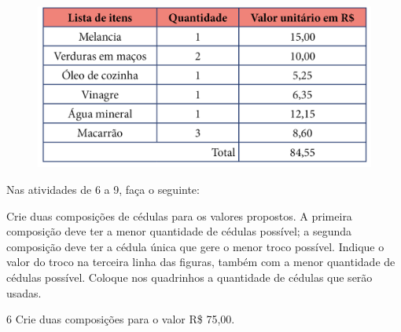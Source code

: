 \begin{figure}[htpb!]
\centering
\includegraphics[width=.8\textwidth]{./media/image75.png}
\end{figure}
\vspace*{-1em}
\begin{mdframed}[linewidth=2pt,linecolor=salmao,roundcorner=10pt]
\vspace*{3em}
\end{mdframed}

Nas atividades de 6 a 9, faça o seguinte:

Crie duas composições de cédulas para os valores propostos. A primeira composição deve ter a menor quantidade de cédulas possível; a segunda composição deve ter a cédula única que gere o menor troco possível. Indique o valor do troco na terceira linha das figuras, também com a menor quantidade de cédulas possível. Coloque nos quadrinhos a quantidade de cédulas que serão usadas.



\num{6} Crie duas composições para o valor R\$ 75,00.

